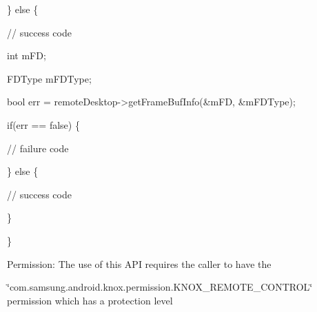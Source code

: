 \begin{DoxyPre}  \} else \{\end{DoxyPre}



\begin{DoxyPre}     // success code\end{DoxyPre}



\begin{DoxyPre}     int	     mFD;\end{DoxyPre}



\begin{DoxyPre}     FDType 	 mFDType;\end{DoxyPre}



\begin{DoxyPre}     bool err = remoteDesktop->getFrameBufInfo(&mFD, &mFDType);\end{DoxyPre}



\begin{DoxyPre}     if(err == false)  \{\end{DoxyPre}



\begin{DoxyPre}         // failure code\end{DoxyPre}



\begin{DoxyPre}     \} else \{\end{DoxyPre}



\begin{DoxyPre}         // success code\end{DoxyPre}



\begin{DoxyPre}     \}\end{DoxyPre}



\begin{DoxyPre}  \}\end{DoxyPre}



\begin{DoxyPre} \end{DoxyPre}


\begin{DoxyParagraph}{\-Permission\-: }
\-The use of this \-A\-P\-I requires the caller to have the
\end{DoxyParagraph}
\char`\"{}com.\-samsung.\-android.\-knox.\-permission.\-K\-N\-O\-X\-\_\-\-R\-E\-M\-O\-T\-E\-\_\-\-C\-O\-N\-T\-R\-O\-L\char`\"{} permission which has a protection level

